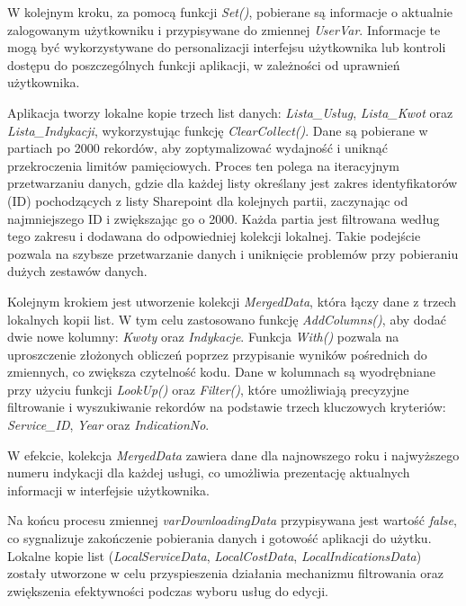 W kolejnym kroku, za pomocą funkcji \emph{Set()}, pobierane są informacje o aktualnie zalogowanym użytkowniku i przypisywane do zmiennej \emph{UserVar}. Informacje te mogą być wykorzystywane do personalizacji interfejsu użytkownika lub kontroli dostępu do poszczególnych funkcji aplikacji, w zależności od uprawnień użytkownika.

Aplikacja tworzy lokalne kopie trzech list danych: \emph{Lista\_Usług}, \emph{Lista\_Kwot} oraz \emph{Lista\_Indykacji}, wykorzystując funkcję \emph{ClearCollect()}. Dane są pobierane w partiach po 2000 rekordów, aby zoptymalizować wydajność i uniknąć przekroczenia limitów pamięciowych. Proces ten polega na iteracyjnym przetwarzaniu danych, gdzie dla każdej listy określany jest zakres identyfikatorów (ID) pochodzących z listy Sharepoint dla kolejnych partii, zaczynając od najmniejszego ID i zwiększając go o 2000. Każda partia jest filtrowana według tego zakresu i dodawana do odpowiedniej kolekcji lokalnej. Takie podejście pozwala na szybsze przetwarzanie danych i uniknięcie problemów przy pobieraniu dużych zestawów danych.

Kolejnym krokiem jest utworzenie kolekcji \emph{MergedData}, która łączy dane z trzech lokalnych kopii list. W tym celu zastosowano funkcję \emph{AddColumns()}, aby dodać dwie nowe kolumny: \emph{Kwoty} oraz \emph{Indykacje}. Funkcja \emph{With()} pozwala na uproszczenie złożonych obliczeń poprzez przypisanie wyników pośrednich do zmiennych, co zwiększa czytelność kodu. Dane w kolumnach są wyodrębniane przy użyciu funkcji \emph{LookUp()} oraz \emph{Filter()}, które umożliwiają precyzyjne filtrowanie i wyszukiwanie rekordów na podstawie trzech kluczowych kryteriów: \emph{Service\_ID}, \emph{Year} oraz \emph{IndicationNo}.

W efekcie, kolekcja \emph{MergedData} zawiera dane dla najnowszego roku i najwyższego numeru indykacji dla każdej usługi, co umożliwia prezentację aktualnych informacji w interfejsie użytkownika.

Na końcu procesu zmiennej \emph{varDownloadingData} przypisywana jest wartość \emph{false}, co sygnalizuje zakończenie pobierania danych i gotowość aplikacji do użytku. Lokalne kopie list (\emph{LocalServiceData}, \emph{LocalCostData}, \emph{LocalIndicationsData}) zostały utworzone w celu przyspieszenia działania mechanizmu filtrowania oraz zwiększenia efektywności podczas wyboru usług do edycji.




